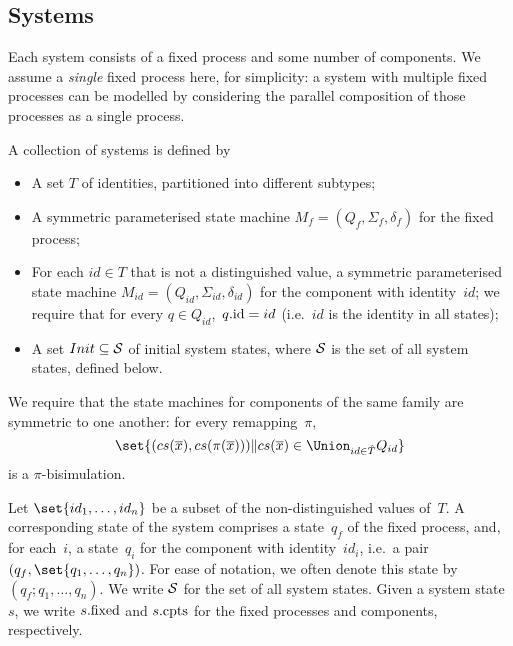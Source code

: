 \subsection{Systems}

Each system consists of a fixed process and some number of components.  We
assume a \emph{single} fixed process here, for simplicity: a system with
multiple fixed processes can be modelled by considering the parallel
composition of those processes as a single process.

\begin{definition}
\label{def:system}
A collection of systems is defined by
%
\begin{itemize}
\item A set $T$ of identities, partitioned into different subtypes;

\item A symmetric parameterised state machine $M_f = (Q_f, \Sigma_f,
  \delta_f)$ for the fixed process;

\item For each $id \in T$ that is not a distinguished value, a symmetric
  parameterised state machine $M_{id} = (Q_{id}, \Sigma_{id}, \delta_{id})$
  for the component with identity~$id$; we require that for every $q \in
  Q_{id}$,\, $q.\id = id$ (i.e.~$id$ is the identity in all states);

\item A set $Init \subseteq \S$ of initial system states, where $\S$ is the
  set of all system states, defined below. 
\end{itemize}

We require that the state machines for components of the same family are
symmetric to one another: for every remapping~$\pi$,\,
\[
\set{ (cs(\vec{x}), cs(\pi(\vec{x}))) \| 
  cs(\vec{x}) \in \textstyle\Union_{id \in \hat{T}} Q_{id}}
\]
is a $\pi$-bisimulation.

Let $\set{id_1,\ldots,id_n}$ be a subset of the non-distinguished
values of~$T$.  A corresponding state of the system comprises a state~$q_f$ of
the fixed process, and, for each~$i$, a state~$q_i$ for the component with
identity~$id_i$, i.e.~a pair $(q_f, \set{q_1,\ldots,q_n})$.  For ease of
notation, we often denote this state by \( (q_f; q_1,\ldots,q_n) \). We write
$\S$ for the set of all system states.  Given a system state~$s$, we write
$s.\fixed$ and $s.\cpt$ for the fixed processes and components, respectively.


\end{definition}
